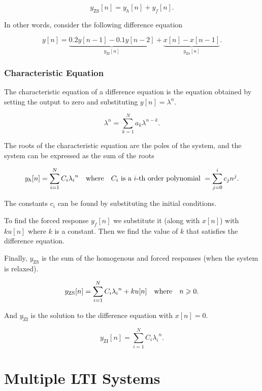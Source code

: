 \documentclass{report}
\begin{document}
\[
	y_\text{ZS}[n] = y_h[n] + y_f[n]
	.\]


In other words, consider the following difference equation

\[
	y[n] = \underbrace{0.2y[n-1] - 0.1y[n-2]}_{y_\text{ZI}[n]} + \underbrace{x[n] - x[n-1]}_{y_\text{ZS}[n]}
	.\]

\subsubsection{Characteristic Equation}

The characteristic equation of a difference equation is the equation obtained by setting the output to zero and substituting $y[n] = \lambda^n$.

\[
	\lambda^n = \sum_{k=1}^{N} a_k \lambda^{n-k}
	.\]

The roots of the characteristic equation are the poles of the system, and the system can be expressed as the sum of the roots

\[
	y_h[n] = \sum_{i=1}^{N} C_i{\lambda_i}^n \qq{where} C_i \text{ is a $i$-th order polynomial } = \sum_{j=0}^{i} c_{j}n^j
	.\]

The constants $c_i$ can be found by substituting the initial conditions.

To find the forced response $y_f[n]$ we substitute it (along with $x[n]$) with $k u[n]$ where $k$ is a constant. Then we find the value of $k$ that satisfies the difference equation.

Finally, $y_\text{ZS}$ is the sum of the homogenous and forced responses (when the system is relaxed).

\[
	y_\text{ZS}[n] = \sum_{i=1}^{N} C_i{\lambda_i}^n + k u[n] \qq{where} n \geq 0
	.\]

And $y_\text{ZI}$ is the solution to the difference equation with $x[n]=0$.

\[
	y_\text{ZI}[n] = \sum_{i=1}^{N} C_i{\lambda_i}^n
	.\]


\section{Multiple LTI Systems}
\end{document}
